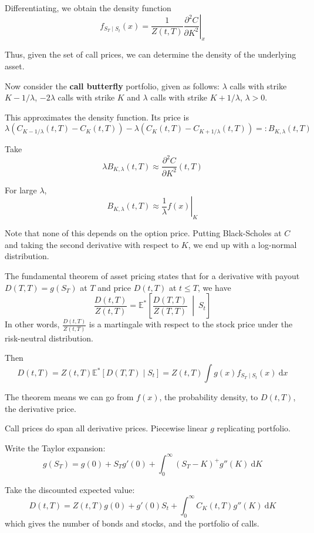 Differentiating, we obtain the density function
\[
    f_{S_T \mid S_t}(x) = \frac{1}{Z(t, T)} \left.\frac{\partial^2 C}{\partial K^2}\right|_x 
\]

Thus, given the set of call prices, we can determine the density of the underlying asset.

Now consider the \textbf{call butterfly} portfolio, given as follows: $\lambda$ calls with strike $K-1/\lambda$, $-2\lambda$ calls with strike $K$ and $\lambda$ calls with strike $K + 1/\lambda$, $\lambda > 0$.

This approximates the density function. Its price is
\[
    \lambda(C_{K - 1/\lambda}(t, T) - C_K(t, T)) - \lambda(C_K(t, T) - C_{K+1/\lambda}(t, T)) =: B_{K, \lambda}(t, T)
\]

Take 
\[
    \lambda B_{K, \lambda}(t, T) \approx \frac{\partial^2 C}{\partial K^2}(t, T)
\]

For large $\lambda$, 
\[
    B_{K, \lambda}(t, T) \approx \left. \frac{1}{\lambda}f(x) \right|_K
\]

Note that none of this depends on the option price. Putting Black-Scholes at $C$ and taking the second derivative with respect to $K$, we end up with a log-normal distribution.

The fundamental theorem of asset pricing states that for a derivative with payout $D(T,T) = g(S_T)$ at $T$ and price $D(t, T)$ at $t \le T$, we have
\[
    \frac{D(t,T)}{Z(t, T)} = \mathbb{E}^\ast \left[ \frac{D(T,T)}{Z(T,T)} ~ \middle| ~ S_t \right]
\]
In other words, $\frac{D(t,T)}{Z(t, T)}$ is a martingale with respect to the stock price under the risk-neutral distribution.

Then 
\[
    D(t, T) = Z(t, T) \mathbb{E}^\ast [D(T,T) \mid S_t] = Z(t, T) \int g(x)f_{S_T \mid S_t}(x)~\mathrm{d}x
\]

The theorem means we can go from $f(x)$, the probability density, to $D(t,T)$, the derivative price.

\begin{remark}
    Call prices do span all derivative prices. Piecewise linear $g$ replicating portfolio.
\end{remark}

Write the Taylor expansion:
\[
    g(S_T) = g(0) + S_T g'(0) + \int_0^\infty (S_T - K)^+ g''(K)~\mathrm{d}K
\]

Take the discounted expected value:
\[
    D(t, T) = Z(t, T)g(0) + g'(0)S_t + \int_0^\infty C_K(t, T) g''(K)~\mathrm{d}K
\]
which gives the number of bonds and stocks, and the portfolio of calls. 

